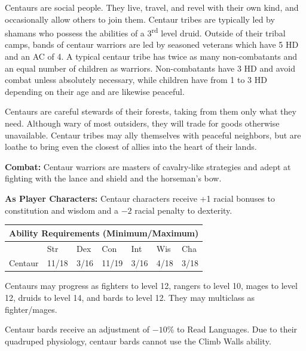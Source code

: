 \begin{multicols}{2}
Centaurs are social people. They live, travel, and revel with their own kind, and occasionally allow others to join them. Centaur tribes are typically led by shamans who possess the abilities of a 3\textsuperscript{rd} level druid. Outside of their tribal camps, bands of centaur warriors are led by seasoned veterans which have 5 HD and an AC of 4. A typical centaur tribe has twice as many non-combatants and an equal number of children as warriors. Non-combatants have 3 HD and avoid combat unless absolutely necessary, while children have from 1 to 3 HD depending on their age and are likewise peaceful.

Centaurs are careful stewards of their forests, taking from them only what they need. Although wary of most outsiders, they will trade for goods otherwise unavailable. Centaur tribes may ally themselves with peaceful neighbors, but are loathe to bring even the closest of allies into the heart of their lands.

\textbf{Combat:} Centaur warriors are masters of cavalry-like strategies and adept at fighting with the lance and shield and the horseman's bow.

\textbf{As Player Characters:} Centaur characters receive +1 racial bonuses to constitution and wisdom and a $-2$ racial penalty to dexterity.

\noindent \begin{minipage}{\columnwidth}

\noindent \begin{tabular}{|p{}|p{}|p{}|p{}|p{}|p{}|p{}|}
\multicolumn{7}{c}{Ability Requirements (Minimum/Maximum)} \\
\hline
	& Str	& Dex	& Con	& Int	& Wis	& Cha	\\
\hline\hline
\rowcolor[gray]{.9}Centaur	& 11/18	& 3/16	& 11/19	& 3/16	& 4/18	& 3/18	\\
\hline
\end{tabular}

\end{minipage}

Centaurs may progress as fighters to level 12, rangers to level 10, mages to level 12, druids to level 14, and bards to level 12. They may multiclass as fighter/mages.

Centaur bards receive an adjustment of $-10$\% to Read Languages. Due to their quadruped physiology, centaur bards cannot use the Climb Walls ability.


\end{multicols}
